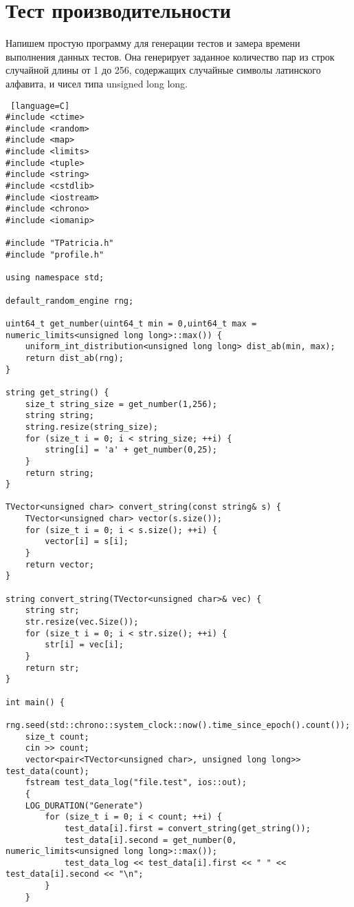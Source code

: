 \section{Тест производительности}

Напишем простую программу для генерации тестов и замера времени выполнения данных тестов. Она генерирует заданное количество пар из строк случайной длины от 1 до 256, содержащих случайные символы латинского алфавита, и чисел типа unsigned long long.

\begin{lstlisting} [language=C]
#include <ctime>
#include <random>
#include <map>
#include <limits>
#include <tuple>
#include <string>
#include <cstdlib>
#include <iostream>
#include <chrono>
#include <iomanip>

#include "TPatricia.h"
#include "profile.h"

using namespace std;

default_random_engine rng;

uint64_t get_number(uint64_t min = 0,uint64_t max = numeric_limits<unsigned long long>::max()) {
    uniform_int_distribution<unsigned long long> dist_ab(min, max);
    return dist_ab(rng);
}

string get_string() {
    size_t string_size = get_number(1,256);
    string string;
    string.resize(string_size);
    for (size_t i = 0; i < string_size; ++i) {
        string[i] = 'a' + get_number(0,25);
    }
    return string;
}

TVector<unsigned char> convert_string(const string& s) {
    TVector<unsigned char> vector(s.size());
    for (size_t i = 0; i < s.size(); ++i) {
        vector[i] = s[i];
    }
    return vector;
}

string convert_string(TVector<unsigned char>& vec) {
    string str;
    str.resize(vec.Size());
    for (size_t i = 0; i < str.size(); ++i) {
        str[i] = vec[i];
    }
    return str;
}

int main() {
    rng.seed(std::chrono::system_clock::now().time_since_epoch().count());
    size_t count;
    cin >> count;
    vector<pair<TVector<unsigned char>, unsigned long long>> test_data(count);
    fstream test_data_log("file.test", ios::out);
    {
    LOG_DURATION("Generate")
        for (size_t i = 0; i < count; ++i) {
            test_data[i].first = convert_string(get_string());
            test_data[i].second = get_number(0, numeric_limits<unsigned long long>::max());
            test_data_log << test_data[i].first << " " << test_data[i].second << "\n";
        }
    }


\end{lstlisting}
